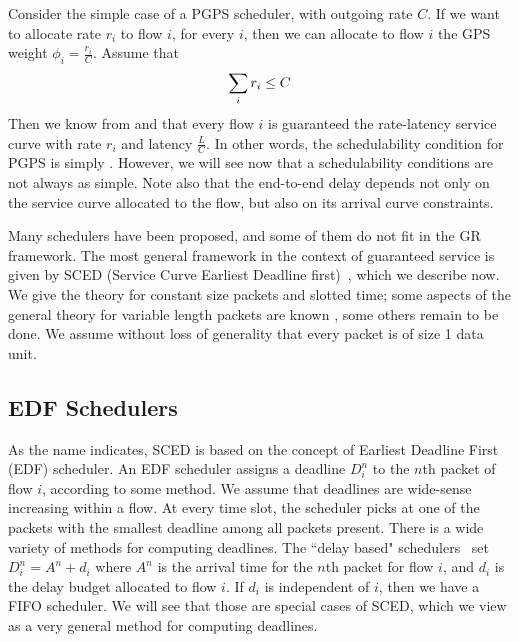 Consider the simple case of a PGPS scheduler, with outgoing rate
$C$. If we want to allocate rate $r_i$ to flow $i$, for every $i$,
then we can allocate to flow $i$ the GPS weight
$\phi_i=\frac{r_i}{C}$. Assume that
\begin{equation}
 \sum_i r_i \leq C
 \mylabel{eq-sched-pgps}
\end{equation}
Then we know from  and  that
every flow $i$ is guaranteed the rate-latency service curve with
rate $r_i$ and latency $\frac{L}{C}$. In other words, the
schedulability condition for PGPS is simply .
However, we will see now that a schedulability conditions are not
always as simple. Note also that the end-to-end delay depends not
only on the service curve allocated to the flow, but also on its
arrival curve constraints.

Many schedulers have been proposed, and some of them do not fit in
the GR framework. The most general framework in the context of
guaranteed service is given by SCED (Service Curve Earliest
Deadline first)~\cite{scp95},%
%
which we describe now. We give the theory for constant size
packets and slotted time; some aspects of the general theory for
variable length packets are known \cite{Changbook}, some others
remain to be done. We assume without loss of generality that every
packet is of size 1 data unit.

\subsection{EDF Schedulers}%
%
%
%
As the name indicates, SCED is based on the concept of Earliest
Deadline First (EDF) scheduler. An EDF scheduler assigns a
deadline $D^n_i$ to the $n$th packet of flow $i$, according to
some method. We assume that deadlines are wide-sense increasing
within a flow. At every time slot, the scheduler picks at  one of
the packets with the smallest deadline among all packets present.
There is a wide variety of methods for computing deadlines. The
``delay based" schedulers~\cite{LWF96} %
%
set $D^n_i= A^n + d_i$ where $A^n$ is the arrival time for the
$n$th packet for flow $i$, and $d_i$ is the delay budget allocated
to flow $i$. If $d_i$ is independent of $i$, then we have a FIFO
scheduler. We will see that those are special cases of SCED, which
we view as a very general method for computing deadlines.

